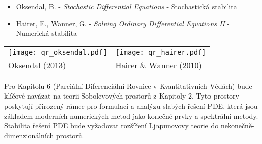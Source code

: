 \begin{tcolorbox}[title=Doporučená literatura: Numerické metody, floatplacement=H]
\begin{itemize}
\item Oksendal, B. - \emph{Stochastic Differential Equations} - Stochastická stabilita
\item Hairer, E., Wanner, G. - \emph{Solving Ordinary Differential Equations II} - Numerická stabilita
\end{itemize}
\begin{center}
\begin{tabular}{m{}m{}}
\texttt{[image: qr\_oksendal.pdf]} & \texttt{[image: qr\_hairer.pdf]} \\
Oksendal (2013) & Hairer \& Wanner (2010) \\
\end{tabular}
\end{center}
\end{tcolorbox}

\begin{transition}
Pro Kapitolu 6 (Parciální Diferenciální Rovnice v Kvantitativních Vědách) bude klíčové navázat na teorii Sobolevových prostorů z Kapitoly 2. Tyto prostory poskytují přirozený rámec pro formulaci a analýzu slabých řešení PDE, která jsou základem moderních numerických metod jako konečné prvky a spektrální metody. Stabilita řešení PDE bude vyžadovat rozšíření Ljapunovovy teorie do nekonečně-dimenzionálních prostorů.
\end{transition}